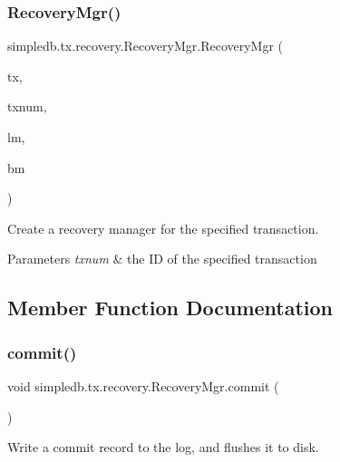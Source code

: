 \subsubsection{\texorpdfstring{Recovery\+Mgr()}{RecoveryMgr()}}
{\footnotesize\ttfamily simpledb.\+tx.\+recovery.\+Recovery\+Mgr.\+Recovery\+Mgr (\begin{DoxyParamCaption}\item[{\hyperlink{classsimpledb_1_1tx_1_1Transaction}{Transaction}}]{tx,  }\item[{int}]{txnum,  }\item[{\hyperlink{classsimpledb_1_1log_1_1LogMgr}{Log\+Mgr}}]{lm,  }\item[{\hyperlink{classsimpledb_1_1buffer_1_1BufferMgr}{Buffer\+Mgr}}]{bm }\end{DoxyParamCaption})\hspace{0.3cm}{\ttfamily [inline]}}

Create a recovery manager for the specified transaction. 
\begin{DoxyParams}{Parameters}
{\em txnum} & the ID of the specified transaction \\
\hline
\end{DoxyParams}


\subsection{Member Function Documentation}
\mbox{\label{classsimpledb_1_1tx_1_1recovery_1_1RecoveryMgr_a7aaf21c8afc97f5118943721c58450bb}} 
\subsubsection{\texorpdfstring{commit()}{commit()}}
{\footnotesize\ttfamily void simpledb.\+tx.\+recovery.\+Recovery\+Mgr.\+commit (\begin{DoxyParamCaption}{ }\end{DoxyParamCaption})\hspace{0.3cm}{\ttfamily [inline]}}

Write a commit record to the log, and flushes it to disk. \mbox{\label{classsimpledb_1_1tx_1_1recovery_1_1RecoveryMgr_a5886374d7a898bffcc9c6b05d18c12a1}} 
